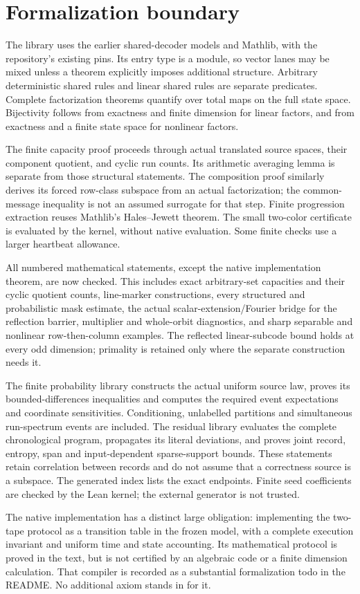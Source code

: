 \section{Formalization boundary}\label{sec:formalization}

The library uses the earlier shared-decoder models and Mathlib, with the
repository's existing pins. Its entry type is a module, so vector lanes may
be mixed unless a theorem explicitly imposes additional structure. Arbitrary
deterministic shared rules and linear shared rules are separate predicates.
Complete factorization theorems quantify over total maps on the full state
space. Bijectivity follows from exactness and finite dimension for linear
factors, and from exactness and a finite state space for nonlinear factors.

The finite capacity proof proceeds through actual translated source spaces,
their component quotient, and cyclic run counts. Its arithmetic averaging
lemma is separate from those structural statements. The composition proof
similarly derives its forced row-class subspace from an actual factorization;
the common-message inequality is not an assumed surrogate for that step.
Finite progression extraction reuses Mathlib's Hales--Jewett theorem. The
small two-color certificate is evaluated by the kernel, without native
evaluation. Some finite checks use a larger heartbeat allowance.

All numbered mathematical statements, except the native implementation theorem,
are now checked. This includes exact arbitrary-set capacities and their cyclic
quotient counts, line-marker constructions, every structured and probabilistic
mask estimate, the actual scalar-extension/Fourier bridge for the reflection
barrier, multiplier and whole-orbit diagnostics, and sharp separable and nonlinear
row-then-column examples. The reflected linear-subcode bound holds at every odd
dimension; primality is retained only where the separate construction needs it.

The finite probability library constructs the actual uniform source law, proves
its bounded-differences inequalities and computes the required event expectations
and coordinate sensitivities. Conditioning, unlabelled partitions and simultaneous
run-spectrum events are included. The residual library evaluates the complete
chronological program, propagates its literal deviations, and proves joint
record, entropy, span and input-dependent sparse-support bounds. These statements
retain correlation between records and do not assume that a correctness source
is a subspace. The generated index lists the exact endpoints. Finite seed
coefficients are checked by the Lean kernel; the external generator is not trusted.

The native implementation has a distinct large obligation: implementing the
two-tape protocol as a transition table in the frozen model, with a complete
execution invariant and uniform time and state accounting. Its mathematical
protocol is proved in the text, but is not certified by an algebraic code or a
finite dimension calculation. That compiler is recorded as a substantial
formalization todo in the README. No additional axiom stands in for it.
